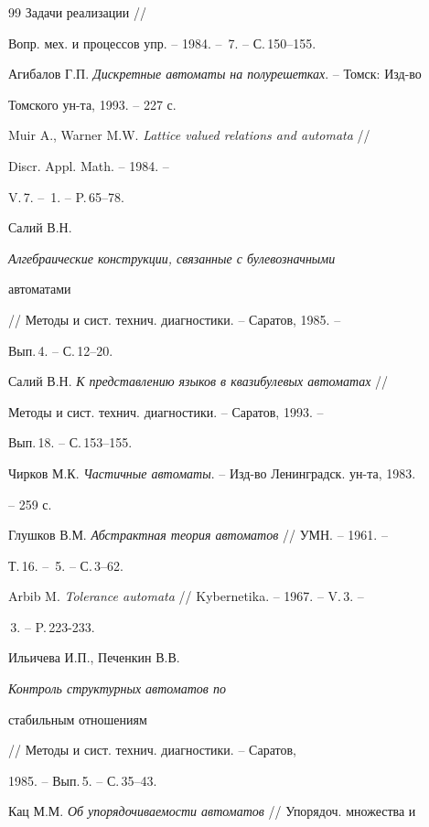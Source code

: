 \begin{thebibliography}{99}
{Задачи реализации} //


Вопр. мех. и процессов упр. -- 1984. -- \No\,7. -- С.\,150--155.




Агибалов Г.П. {\em Дискретные автоматы на полурешетках}. -- Томск: Изд-во


Томского ун-та, 1993. -- 227 с.




Muir A., Warner M.W. {\em Lattice valued relations and automata} //


Discr. Appl. Math. -- 1984. --


V.\,7. -- \No\,1. -- P.\,65--78.




Салий В.Н. {\em Алгебраические конструкции, связанные с булевозначными


автоматами} // Методы и сист. технич. диагностики. -- Саратов, 1985. --


Вып.\,4. -- С.\,12--20.




Салий В.Н. {\em К представлению языков в квазибулевых автоматах} //


Методы и сист. технич. диагностики. -- Саратов, 1993. --


Вып.\,18. -- С.\,153--155.




Чирков М.К. {\em Частичные автоматы}. -- Изд-во Ленинградск. ун-та, 1983.


-- 259 с.




Глушков В.М. {\em Абстрактная теория автоматов} // УМН. -- 1961. --


Т.\,16. -- \No\,5. -- С.\,3--62.




Arbib M. {\em Tolerance automata} // Kybernetika. -- 1967. -- V.\,3. --


\No\,3. -- P.\,223-233.




Ильичева И.П., Печенкин В.В. {\em Контроль структурных автоматов по


стабильным отношениям} // Методы и сист. технич. диагностики. -- Саратов,


1985. -- Вып.\,5. -- С.\,35--43.




Кац М.М. {\em Об упорядочиваемости автоматов} // Упорядоч. множества и



\end{thebibliography}
